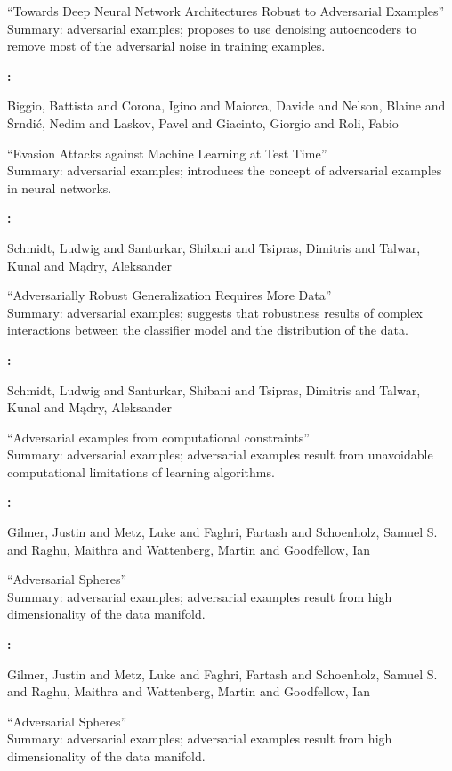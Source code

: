 ``Towards Deep Neural Network Architectures Robust to Adversarial Examples''\\
Summary: adversarial examples; proposes to use denoising autoencoders to remove most of the adversarial noise in training examples.


\textbf{\cite{Biggio2013}:}

Biggio, Battista and Corona, Igino and Maiorca, Davide and Nelson, Blaine and Šrndić, Nedim and Laskov, Pavel and Giacinto, Giorgio and Roli, Fabio

``Evasion Attacks against Machine Learning at Test Time''\\
Summary: adversarial examples; introduces the concept of adversarial examples in neural networks.


\textbf{\cite{Schmidt2018}:}

Schmidt, Ludwig and Santurkar, Shibani and Tsipras, Dimitris and Talwar, Kunal and Mądry, Aleksander

``Adversarially Robust Generalization Requires More Data''\\
Summary: adversarial examples; suggests that robustness results of complex interactions between the classifier model and the distribution of the data.


\textbf{\cite{Bubeck2018}:}

Schmidt, Ludwig and Santurkar, Shibani and Tsipras, Dimitris and Talwar, Kunal and Mądry, Aleksander

``Adversarial examples from computational constraints''\\
Summary: adversarial examples; adversarial examples result from unavoidable computational limitations of learning algorithms.


\textbf{\cite{Gilmer2018}:}

Gilmer, Justin and Metz, Luke and Faghri, Fartash and Schoenholz, Samuel S. and Raghu, Maithra and Wattenberg, Martin and Goodfellow, Ian

``Adversarial Spheres''\\
Summary: adversarial examples; adversarial examples result from high dimensionality of the data manifold.


\textbf{\cite{Gilmer2018}:}

Gilmer, Justin and Metz, Luke and Faghri, Fartash and Schoenholz, Samuel S. and Raghu, Maithra and Wattenberg, Martin and Goodfellow, Ian

``Adversarial Spheres''\\
Summary: adversarial examples; adversarial examples result from high dimensionality of the data manifold.


